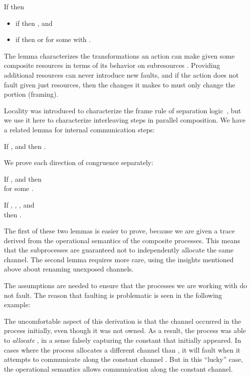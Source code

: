 \documentclass{entcs}
\begin{document}
\begin{lemma}[Locality]
  If  then
\begin{itemize}
  \item if  then , and
  \item if  then
     or  for some  with .
\end{itemize}
\end{lemma}
The lemma characterizes the transformations an action can make given
some composite resources  in terms of its behavior on
subresources .  Providing additional resources can never
introduce new faults, and if the action does not fault given just
 resources, then the changes it makes to  must only
change the  portion (framing).

Locality was introduced to characterize the frame rule of separation
logic~\cite{Calcagno2007}, but we use it here to characterize
interleaving steps in parallel composition.  We have a related lemma
for internal communication steps:

\begin{lemma}[Communication]
  If ,
 and  then 
    .
\end{lemma}

We prove each direction of congruence separately:
\begin{lemma}
  If ,
   and 
  then\\  for some
  .
\end{lemma}
\begin{lemma}
  If ,
  , , and \\
   then 
.
\end{lemma}
The first of these two lemmas is easier to prove, because we are given
a trace  derived from the operational semantics of the composite
processes.  This means that the subprocesses are guaranteed not to
independently allocate the same channel.  The second lemma requires
more care, using the insights mentioned above about renaming unexposed
channels.

The assumptions  are needed to ensure that
the processes we are working with do not fault.  The reason that
faulting is problematic is seen in the following example:

The uncomfortable aspect of this derivation is that the channel 
occurred in the process initially, even though it was not owned.  As a
result, the process was able to \emph{allocate} , in a sense
falsely capturing the constant  that initially appeared.  In cases
where the process allocates a different channel than , it will
fault when it attempts to communicate along the constant channel .
But in this ``lucky'' case, the operational semantics allows
communication along the constant channel.
\end{document}
